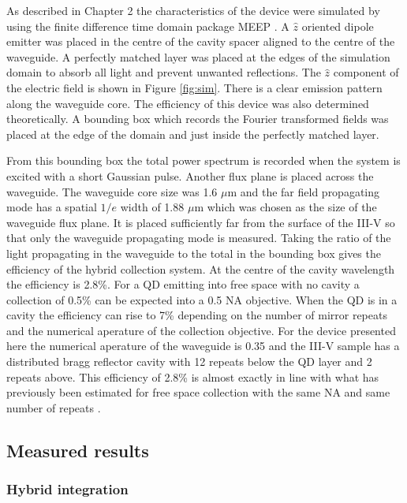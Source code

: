 As described in Chapter 2 the characteristics of the device were simulated by
using the finite difference time domain package MEEP \cite{oskooi2010meep,
mandelshtam1997harmonic}. A $\hat{z}$ oriented dipole emitter was placed in the
centre of the cavity spacer aligned to the centre of the waveguide. A perfectly
matched layer was placed at the edges of the simulation domain to absorb all
light and prevent unwanted reflections. The $\hat{z}$ component of the electric
field is shown in Figure \ref{fig:sim}. There is a clear emission pattern along
the waveguide core. The efficiency of this device was also determined
theoretically. A bounding box which records the Fourier transformed fields was
placed at the edge of the domain and just inside the perfectly matched layer.

From this bounding box the total power spectrum is recorded when the system is
excited with a short Gaussian pulse. Another flux plane is placed across the
waveguide. The waveguide core size was 1.6 $\mu \mathrm{m}$ and the far field
propagating mode has a spatial $1/e$ width of 1.88 $\mu \mathrm{m}$ which was
chosen as the size of the waveguide flux plane. It is placed sufficiently far
from the surface of the III-V so that only the waveguide propagating mode is
measured. Taking the ratio of the light propagating in the waveguide to the
total in the bounding box gives the efficiency of the hybrid collection system.
At the centre of the cavity wavelength the efficiency is 2.8\%. For a QD
emitting into free space with no cavity a collection of 0.5\% can be expected
into a 0.5 NA objective. When the QD is in a cavity the efficiency can rise to
7\% depending on the number of mirror repeats and the numerical aperature of the
collection objective. For the device presented here the numerical aperature of
the waveguide is 0.35 and the III-V sample has a distributed bragg reflector
cavity with 12 repeats below the QD layer and 2 repeats above. This efficiency
of 2.8\% is almost exactly in line with what has previously been estimated for
free space collection with the same NA and same number of repeats
\cite{bennett2006single}.

\subsection{Measured results}

\subsubsection{Hybrid integration}

